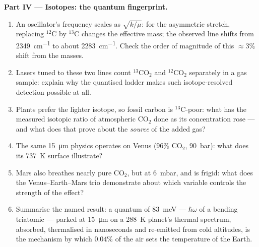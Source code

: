 \begin{problem}
\medskip\noindent\textbf{Part IV --- Isotopes: the quantum
fingerprint.}
\begin{enumerate}[resume]
  \item An oscillator's frequency scales as $\sqrt{k/\mu}$: for the
        asymmetric stretch, replacing $^{12}$C by $^{13}$C changes
        the effective mass; the observed line shifts from
        \qty{2349}{cm^{-1}} to about \qty{2283}{cm^{-1}}. Check the
        order of magnitude of this $\approx 3\%$ shift from the
        masses.
  \item Lasers tuned to these two lines count $^{13}$CO$_2$ and
        $^{12}$CO$_2$ separately in a gas sample: explain why the
        quantised ladder makes such isotope-resolved detection
        possible at all.
  \item Plants prefer the lighter isotope, so fossil carbon is
        $^{13}$C-poor: what has the measured isotopic ratio of
        atmospheric CO$_2$ done as its concentration rose --- and
        what does that prove about the \emph{source} of the added
        gas?
  \item The same \qty{15}{\micro m} physics operates on Venus
        ($96\%$ CO$_2$, \qty{90}{bar}): what does its
        \qty{737}{K} surface illustrate?
  \item Mars also breathes nearly pure CO$_2$, but at \qty{6}{mbar},
        and is frigid: what does the Venus--Earth--Mars trio
        demonstrate about which variable controls the strength of
        the effect?
  \item Summarise the named result: a quantum of \qty{83}{meV} ---
        $\hbar\omega$ of a bending triatomic --- parked at
        \qty{15}{\micro m} on a \qty{288}{K} planet's thermal
        spectrum, absorbed, thermalised in nanoseconds and
        re-emitted from cold altitudes, is the mechanism by which
        $0.04\%$ of the air sets the temperature of the Earth.
\end{enumerate}
\end{problem}
